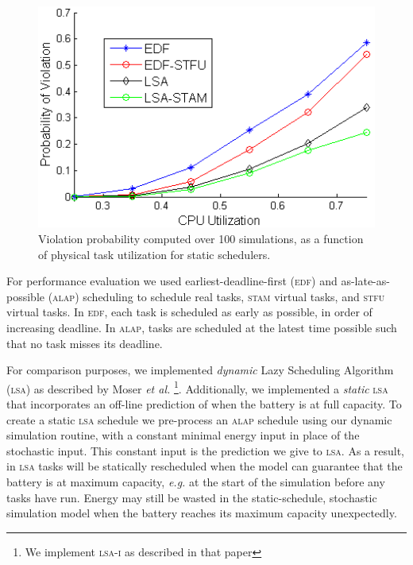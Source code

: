 \begin{figure}[tb]
\begin{center}
\includegraphics[scale=0.55]{violations_vs_cpuutil.png}
\caption{
Violation probability computed over 100 simulations, as a function of physical task utilization for static schedulers.\label{fig:violations_vs_cpuutil}
}
\end{center}
\end{figure}


For performance evaluation we 
used earliest-deadline-first (\textsc{edf}) and as-late-as-possible (\textsc{alap}) scheduling to schedule real tasks, \textsc{stam} virtual tasks, and \textsc{stfu} virtual tasks. 
In \textsc{edf}, each task is scheduled as early as possible, in order of increasing deadline.  
In \textsc{alap}, tasks are scheduled at the latest time possible such that no task misses its deadline.  

For comparison purposes, we implemented \emph{dynamic} Lazy Scheduling Algorithm (\textsc{lsa}) 
as described by Moser \emph{et al.} \cite{moser2007real}\footnote{We implement \textsc{lsa-i} as described in that paper}.
Additionally, we implemented a \emph{static} \textsc{lsa} that incorporates 
an off-line prediction of when the battery is at full capacity. 
To create a static \textsc{lsa} schedule we pre-process an \textsc{alap} schedule using our dynamic simulation routine, with a constant minimal energy input in place of the stochastic input.  This constant input is the prediction we give to \textsc{lsa}.  As a result, in \textsc{lsa} tasks will be statically rescheduled when the model can guarantee that the battery is at maximum capacity, \emph{e.g.} at the start of the simulation before any tasks have run.  Energy may still be wasted in the static-schedule, stochastic simulation model when the battery reaches its maximum capacity unexpectedly.  


